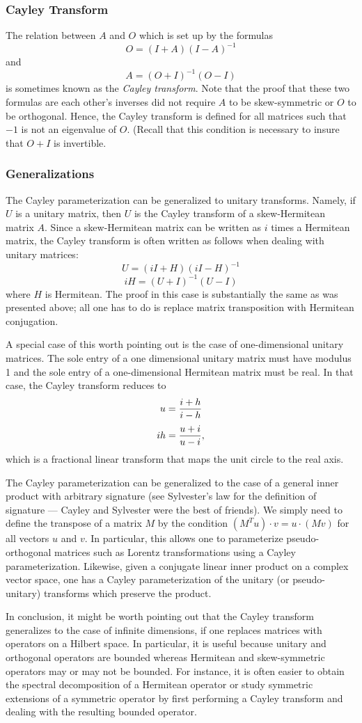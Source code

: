\documentclass[12pt]{article}
\begin{document}
\subsubsection{Cayley Transform}

The relation between $A$ and $O$ which is set up by the formulas
 $$O = (I + A) (I - A)^{-1}$$
and
 $$A = (O + I)^{-1} (O - I)$$
is sometimes known as the \emph{Cayley transform}.  Note that the proof that these two formulas are each other's inverses did not require $A$ to be skew-symmetric or $O$ to be orthogonal.  Hence, the Cayley transform is defined for all matrices such that $-1$ is not an eigenvalue of $O$.  (Recall that this condition is necessary to insure that $O + I$ is invertible.

\subsubsection{Generalizations}

The Cayley parameterization can be generalized to unitary transforms.  Namely, if $U$ is a unitary matrix, then $U$ is the Cayley transform of a skew-Hermitean matrix $A$.  Since a skew-Hermitean matrix can be written as $i$ times a Hermitean matrix, the Cayley transform is often written as follows when dealing with unitary matrices:
 $$U = (iI + H) (iI - H)^{-1}$$
 $$iH = (U + I)^{-1} (U - I)$$
where $H$ is Hermitean.  The proof in this case is substantially the same as was presented above; all one has to do is replace matrix transposition with Hermitean conjugation.

A special case of this worth pointing out is the case of one-dimensional unitary matrices.  The sole entry of a one dimensional unitary matrix must have modulus 1 and the sole entry of a one-dimensional Hermitean matrix must be real.  In that case, the Cayley transform reduces to
 $$u = {i + h \over i - h}$$
 $$ih  = {u + i \over u - i} ,$$
which is a fractional linear transform that maps the unit circle to the real axis.

The Cayley parameterization can be generalized to the case of a general inner product with arbitrary signature (see Sylvester's law for the definition of signature --- Cayley and Sylvester were the best of friends).  We simply need to define the transpose of a matrix $M$ by the condition $(M^T u) \cdot v = u \cdot (M v)$ for all vectors $u$ and $v$.  In particular, this allows one to parameterize pseudo-orthogonal matrices such as Lorentz transformations using a Cayley parameterization.  Likewise, given a conjugate linear inner product on a complex vector space, one has a Cayley parameterization of the unitary (or pseudo-unitary) transforms which preserve the product.

In conclusion, it might be worth pointing out that the Cayley transform generalizes to the case of infinite dimensions, if one replaces matrices with operators on a Hilbert space.  In particular, it is useful because unitary and orthogonal operators are bounded whereas Hermitean and skew-symmetric operators may or may not be bounded.  For instance, it is often easier to obtain the spectral decomposition of a Hermitean operator or study symmetric extensions of a symmetric operator by first performing a Cayley transform and dealing with the resulting bounded operator.
\end{document}

